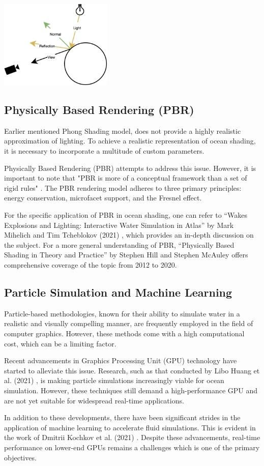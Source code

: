 \begin{minipage}{1\textwidth}
    \centering
    \includegraphics[width=0.4\textwidth]{"images/phong_graph.png"}
    \label{fig:phong_graph}
\end{minipage}

\subsection{Physically Based Rendering (PBR)}
Earlier mentioned Phong Shading model, does not provide a highly realistic approximation of lighting. To achieve a realistic representation of ocean shading, it is necessary to incorporate a multitude of custom parameters.

Physically Based Rendering (PBR) attempts to address this issue. However, it is important to note that "PBR is more of a conceptual framework than a set of rigid rules" \cite{wilson2017}. The PBR rendering model adheres to three primary principles: energy conservation, microfacet support, and the Fresnel effect.

For the specific application of PBR in ocean shading, one can refer to “Wakes Explosions and Lighting: Interactive Water Simulation in Atlas” by Mark Mihelich and Tim Tcheblokov (2021) \cite{mark2021}, which provides an in-depth discussion on the subject. For a more general understanding of PBR, “Physically Based Shading in Theory and Practice” by Stephen Hill and Stephen McAuley \cite{stephan2012} offers comprehensive coverage of the topic from 2012 to 2020.

\subsection{Particle Simulation and Machine Learning}
Particle-based methodologies, known for their ability to simulate water in a realistic and visually compelling manner, are frequently employed in the field of computer graphics. However, these methods come with a high computational cost, which can be a limiting factor.

Recent advancements in Graphics Processing Unit (GPU) technology have started to alleviate this issue. Research, such as that conducted by Libo Huang et al. (2021) \cite{huang2021}, is making particle simulations increasingly viable for ocean simulation. However, these techniques still demand a high-performance GPU and are not yet suitable for widespread real-time applications.

In addition to these developments, there have been significant strides in the application of machine learning to accelerate fluid simulations. This is evident in the work of Dmitrii Kochkov et al. (2021) \cite{kochkov2021machine}. Despite these advancements, real-time performance on lower-end GPUs remains a challenges which is one of the primary objectives.